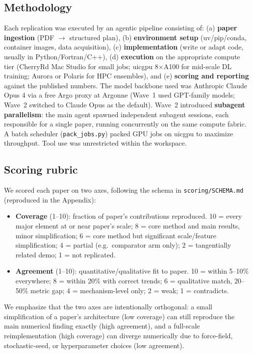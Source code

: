 \documentclass[11pt]{article}
\begin{document}
\subsection{Methodology}
Each replication was executed by an agentic pipeline consisting of:
(a) \textbf{paper ingestion} (PDF $\rightarrow$ structured plan),
(b) \textbf{environment setup} (uv/pip/conda, container images, data
acquisition),
(c) \textbf{implementation} (write or adapt code, usually in
Python/Fortran/C++),
(d) \textbf{execution} on the appropriate compute tier
(CherryRd Mac Studio for small jobs; uicgpu 8$\times$A100 for mid-scale
DL training; Aurora or Polaris for HPC ensembles), and
(e) \textbf{scoring and reporting} against the published numbers.
The model backbone used was Anthropic Claude Opus 4 via a free Argo proxy at
Argonne (Wave~1 used GPT-family models; Wave~2 switched to Claude Opus as the
default). Wave~2 introduced \textbf{subagent parallelism}: the main agent
spawned independent subagent sessions, each responsible for a single paper,
running concurrently on the same compute fabric. A batch scheduler
(\texttt{pack\_jobs.py}) packed GPU jobs on uicgpu to maximize throughput.
Tool use was unrestricted within the workspace.

\subsection{Scoring rubric}
We scored each paper on two axes, following the schema in
\texttt{scoring/SCHEMA.md} (reproduced in the Appendix):
\begin{itemize}
  \item \textbf{Coverage} (1--10): fraction of paper's contributions reproduced.
  10 = every major element at or near paper's scale; 8 = core method and main
  results, minor simplification; 6 = core method but significant scale/feature
  simplification; 4 = partial (e.g.\ comparator arm only); 2 = tangentially
  related demo; 1 = not replicated.
  \item \textbf{Agreement} (1--10): quantitative/qualitative fit to paper.
  10 = within 5--10\% everywhere; 8 = within 20\% with correct trends; 6 =
  qualitative match, 20--50\% metric gap; 4 = mechanism-level only; 2 = weak;
  1 = contradicts.
\end{itemize}
We emphasize that the two axes are intentionally orthogonal: a small
simplification of a paper's architecture (low coverage) can still reproduce the
main numerical finding exactly (high agreement), and a full-scale reimplementation
(high coverage) can diverge numerically due to force-field, stochastic-seed, or
hyperparameter choices (low agreement).
\end{document}
